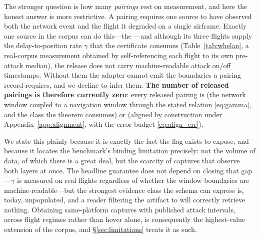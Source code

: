 The stronger question is how many \emph{pairings} rest on measurement, and here
the honest answer is more restrictive. A  pairing
requires one source to have observed both the network event and the flight it
degraded on a single airframe. Exactly one source in the corpus can do this---the
---and although its three flights supply the
delay-to-position rate $\gamma$ that the certificate consumes
(Table~\ref{tab:whelan}, a real-corpus measurement obtained by
self-referencing each flight to its own pre-attack median), the release does not
carry machine-readable attack on/off timestamps. Without them the adapter cannot
emit the  boundaries a pairing record requires, and we decline
to infer them. \textbf{The number of released 
pairings is therefore currently zero}: every released pairing is
 (the network window coupled to a navigation window through
the stated relation \eqref{eq:gamma}, and the class the theorem consumes) or
 (aligned by construction under
Appendix~\ref{app:alignment}, with the error budget \eqref{eq:align_err}).

We state this plainly because it is exactly the fact the flag exists to expose,
and because it locates the benchmark's binding limitation precisely: not the
volume of data, of which there is a great deal, but the scarcity of captures
that observe both layers at once. The headline guarantee does not depend on
closing that gap---$\gamma$ is measured on real flights regardless of whether the
window boundaries are machine-readable---but the strongest evidence class the
schema can express is, today, unpopulated, and a reader filtering the artifact to
 will correctly retrieve nothing. Obtaining
same-platform captures with published attack intervals, across flight regimes
rather than hover alone, is consequently the highest-value extension of the
corpus, and \S\ref{sec:limitations} treats it as such.

\begin{table}[t]
\centering
\caption{Acquisition provenance across the ingested corpus. Counts are from the
schema-validated adapter outputs; the split is machine-generated by
 so the paper cannot drift from the
artifact. Acquisition is a property of the \emph{source}; the strictly stronger
 distribution is discussed in the text.}
\label{tab:provenance}
\small
\renewcommand{\arraystretch}{1.15}

\end{table}

